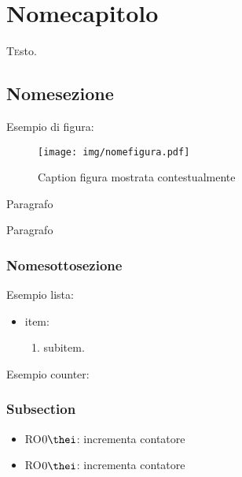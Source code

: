 \chapter{Nomecapitolo\label{sec:labelcapitolo}}
\lettrine[findent=1.5em]{T}esto.

    \section{Nomesezione\label{sec:labelsezione}}
    
    Esempio di figura:
    \begin{figure}[htp]
        \centering
        \texttt{[image: img/nomefigura.pdf]}
        \caption[Caption figura per menu]{Caption figura mostrata contestualmente}
        \label{fig:labelfigura}
    \end{figure}
    
    Paragrafo
    
    Paragrafo
    
    \subsection{Nomesottosezione\label{sec:labelsottosezione}}
    
    Esempio lista:

    \begin{itemize}
        \item item:
            \begin{enumerate}
                \item subitem.
                \label{lst:labelsublist}
            \end{enumerate}
        \label{lst:labellist}
    \end{itemize}
    
    Esempio counter:
    
    \setcounter{i}{1}
    
    \subsection{Subsection\label{sec:labelsubsection}}
    \begin{itemize}
        \item RO$0\thei$: incrementa contatore 
        \item RO$0\thei$: incrementa contatore 
        \label{lst:labellist}
    \end{itemize}
    
